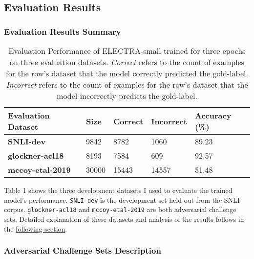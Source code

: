 \documentclass[11pt,a4paper]{article}
\begin{document}
\subsection{Evaluation Results}

\subsubsection{Evaluation Results Summary}
\label{sec:evaluation}
\begin{table}[hbt!]
\begin{center}
\tiny
\begin{tabular}{p{}|p{} p{} p{} p{}}
  \textbf{Evaluation Dataset} & \textbf{Size} & \textbf{Correct} & \textbf{Incorrect} & \textbf{Accuracy} (\%)\\
  \hline
  \textbf{SNLI-dev} \tablefootnote{\cite{bowman-etal-2015-large}} & 9842 & 8782 & 1060 & 89.23 \\
  \textbf{glockner-acl18} \tablefootnote{\cite{glockner_acl18}} & 8193 & 7584 & 609 & 92.57 \\
  \textbf{mccoy-etal-2019} \tablefootnote{\cite{DBLP:journals/corr/abs-1902-01007}} & 30000 & 15443 & 14557 & 51.48 \\
\end{tabular}
\end{center}
\caption{Evaluation Performance of ELECTRA-small trained for three epochs on three evaluation datasets. \textit{Correct} refers to the count of examples for the row's dataset that the model correctly predicted the gold-label. \textit{Incorrect} refers to the count of examples for the row's dataset that the model incorrectly predicts the gold-label.}
\end{table}

Table 1 shows the three development datasets I used to evaluate the trained model's performance. \texttt{SNLI-dev} is the development set held out from the SNLI corpus. \texttt{glockner-acl18} and \texttt{mccoy-etal-2019} are both adversarial challenge sets. Detailed explanation of these datasets and analysis of the results follows in the \hyperref[sec:acsd]{following section}.

\subsubsection{Adversarial Challenge Sets Description}
\label{sec:acsd}
\end{document}
